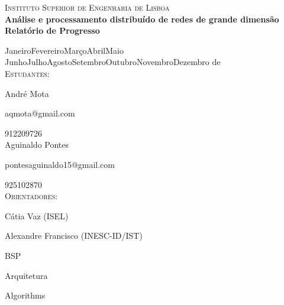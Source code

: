 \documentclass[a4paper,10pt]{report}
\begin{document}
\vskip0.5cm                
\begin{center}
  {\LARGE \textsc{Instituto Superior de Engenharia de Lisboa}}
  \\[1cm]
  {\huge \bf Análise e processamento distribuído de redes de grande dimensão}
  \\[0.5cm]
  {\large {\bf Relatório de Progresso}}
  
  {\large
    \ifcase\month\or Janeiro\or Fevereiro\or Março\or Abril\or Maio\or
      Junho\or Julho\or Agosto\or Setembro\or Outubro\or Novembro\or Dezembro
    \fi
    \space de\space\the\year}
    \\[0.5cm]
    \textsc{Estudantes:}
    
    André Mota
    
    aqmota@gmail.com
    
    912209726
    \\[0.25cm]
    Aguinaldo Pontes
    
    pontesaguinaldo15@gmail.com
    
    925102870
    \\[0.5cm]
    \textsc{Orientadores:}
    
    Cátia Vaz (ISEL)
    
    Alexandre Francisco (INESC-ID/IST)

\end{center}


\tableofcontents




{BSP}

{Arquitetura}

{Algorithms}





\end{document}
